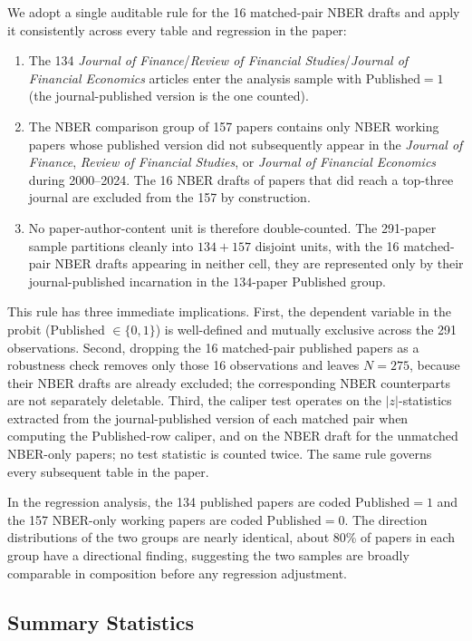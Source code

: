 \documentclass[12pt]{article}
\newcommand{\JF}{\textit{Journal of Finance}}
\newcommand{\RFS}{\textit{Review of Financial Studies}}
\newcommand{\JFE}{\textit{Journal of Financial Economics}}
\begin{document}
We adopt a single auditable rule for the 16 matched-pair NBER drafts
and apply it consistently across every table and regression in the
paper:
\begin{enumerate}[label=(\roman*),leftmargin=2em,itemsep=2pt,topsep=2pt]
\item The 134 \JF{}/\RFS{}/\JFE{} articles enter the analysis sample
with $\text{Published}=1$ (the journal-published version is the one
counted).
\item The NBER comparison group of 157 papers contains only
NBER working papers whose published version did not subsequently appear
in the \JF{}, \RFS{}, or \JFE{} during 2000--2024.  The 16 NBER drafts
of papers that did reach a top-three journal are excluded from the 157
by construction.
\item No paper-author-content unit is therefore double-counted.  The
291-paper sample partitions cleanly into $134 + 157$ disjoint units,
with the 16 matched-pair NBER drafts appearing in neither cell, they
are represented only by their journal-published incarnation in the
$134$-paper Published group.
\end{enumerate}
This rule has three immediate implications.  First, the dependent
variable in the probit (Published $\in \{0,1\}$) is well-defined and
mutually exclusive across the 291 observations.  Second, dropping the 16 matched-pair
published papers as a robustness check removes only those 16
observations and leaves $N = 275$, because their
NBER drafts are already excluded; the corresponding NBER counterparts
are not separately deletable.  Third, the
caliper test operates on the
$|z|$-statistics extracted from the journal-published version of each
matched pair when computing the Published-row caliper, and on the NBER
draft for the unmatched NBER-only papers; no test statistic is counted
twice.  The same rule governs every subsequent table in the paper.

In the regression analysis, the 134 published papers are coded
$\text{Published}=1$ and the 157 NBER-only working papers are coded
$\text{Published}=0$.  The direction distributions of the two groups
are nearly identical, about 80\% of papers in each group have a
directional finding, suggesting the two samples are broadly comparable
in composition before any regression adjustment.

\subsection{Summary Statistics}
\end{document}
